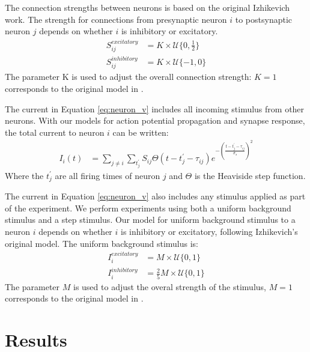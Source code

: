 \documentclass[a4paper,11pt]{article}
\begin{document}
The connection strengths between neurons is based on the original Izhikevich work.
The strength for connections from presynaptic neuron $i$ to postsynaptic neuron $j$ depends on whether $i$ is inhibitory or excitatory.
\begin{align}
 S_{ij}^{excitatory} &= K \times \mathcal{U}\{0,\frac{1}{2} \} \\
 S_{ij}^{inhibitory} &= K \times \mathcal{U}\{-1,0 \} 
\end{align}
The parameter K is used to adjust the overall connection strength: $K=1$ corresponds to the original model in \cite{izzy_code}. 

The current in Equation \ref{eq:neuron_v} includes all incoming stimulus from other neurons.
With our models for action potential propagation and synapse response, the total current to neuron $i$ can be written:
\begin{align}
 I_i(t) &= \sum_{j\ne i} \sum_{t^\prime_j} S_{ij}  \Theta(t-t^\prime_j-\tau_{ij})e^{-(\frac{t-t^\prime_j-\tau_{ij}}{\sigma_s})^2}
\end{align}
Where the $t^\prime_j$ are all firing times of neuron $j$ and $\Theta$ is the Heaviside step function.

The current in Equation \ref{eq:neuron_v} also includes any stimulus applied as part of the experiment.
We perform experiments using both a uniform background stimulus and a step stimulus.
Our model for uniform background stimulus to a neuron $i$ depends on whether $i$ is inhibitory or excitatory, following Izhikevich's original model.
The uniform background stimulus is:
\begin{align}
 I_i^{excitatory} &= M \times \mathcal{U}\{0,1 \} \\
 I_i^{inhibitory} &= \frac{2}{5} M \times \mathcal{U}\{0,1 \}
\end{align}
The parameter $M$ is used to adjust the overal strength of the stimulus, $M=1$ corresponds to the original model in \cite{izzy_code}.

\section{Results}
\end{document}
